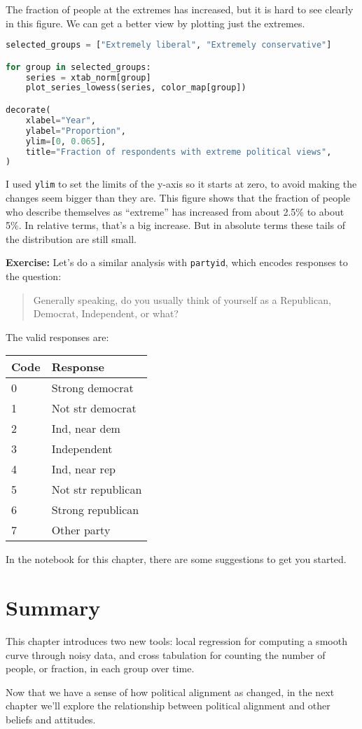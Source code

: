 The fraction of people at the extremes has increased, but it is hard to
see clearly in this figure. We can get a better view by plotting just
the extremes.

\begin{lstlisting}[language=Python,style=source]
selected_groups = ["Extremely liberal", "Extremely conservative"]

for group in selected_groups:
    series = xtab_norm[group]
    plot_series_lowess(series, color_map[group])

decorate(
    xlabel="Year",
    ylabel="Proportion",
    ylim=[0, 0.065],
    title="Fraction of respondents with extreme political views",
)
\end{lstlisting}

I used \passthrough{\lstinline!ylim!} to set the limits of the y-axis so
it starts at zero, to avoid making the changes seem bigger than they
are. This figure shows that the fraction of people who describe
themselves as ``extreme'' has increased from about 2.5\% to about 5\%.
In relative terms, that's a big increase. But in absolute terms these
tails of the distribution are still small.

\textbf{Exercise:} Let's do a similar analysis with
\passthrough{\lstinline!partyid!}, which encodes responses to the
question:

\begin{quote}
Generally speaking, do you usually think of yourself as a Republican,
Democrat, Independent, or what?
\end{quote}

The valid responses are:

\begin{longtable}[]{@{}ll@{}}
\midrule()
Code & Response \\
\midrule()
\endhead
0 & Strong democrat \\
1 & Not str democrat \\
2 & Ind, near dem \\
3 & Independent \\
4 & Ind, near rep \\
5 & Not str republican \\
6 & Strong republican \\
7 & Other party \\
\midrule()
\end{longtable}

In the notebook for this chapter, there are some suggestions to get you
started.

\hypertarget{summary}{%
\section{Summary}\label{summary}}

This chapter introduces two new tools: local regression for computing a
smooth curve through noisy data, and cross tabulation for counting the
number of people, or fraction, in each group over time.

Now that we have a sense of how political alignment as changed, in the
next chapter we'll explore the relationship between political alignment
and other beliefs and attitudes.

